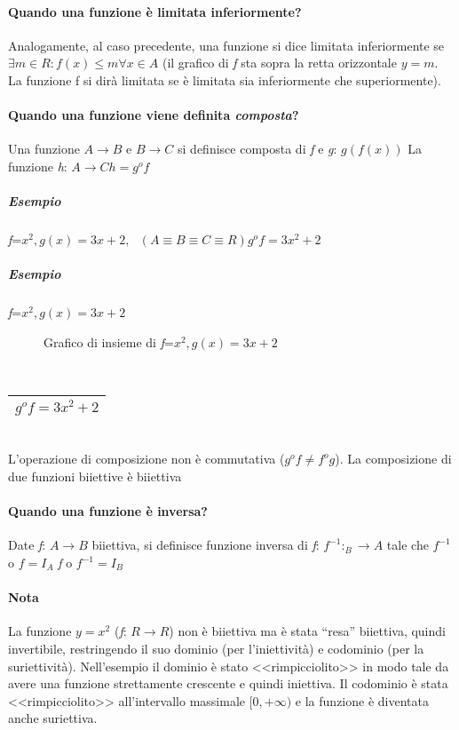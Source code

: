 \paragraph{Quando una funzione è limitata inferiormente?}
Analogamente, al caso precedente, una funzione si dice limitata inferiormente
se $\exists m\in R:f(x)\leq m \forall x \in A$ (il grafico di \textit{f} sta
sopra la retta orizzontale $y=m$. La funzione f si dirà limitata se è limitata
sia inferiormente che superiormente).
\paragraph{Quando una funzione viene definita \textit{composta}?}
Una funzione $A\to B \text{ e } B\to C$ si definisce composta di \textit{f} e
\textit{g}: $g(f(x))$ La funzione \textit{h}: $A\to C h=g^of$
\subparagraph{Esempio} \textit{f}=$x^2,g(x)=3x+2, \text{ } (A \equiv B \equiv C
\equiv R) g^of=3x^2+2$
\subparagraph {Esempio}
\textit{f}=$x^2,g(x)=3x+2$
\begin{figure}[!ht]
	\centering
	\caption{Grafico di insieme di \textit{f}=$x^2,g(x)=3x+2$}
\end{figure}\\
\begin{tabular}{|l|}
	\hline
		$g^of=3x^2+2$\\
	\hline
\end{tabular}\\
L'operazione di composizione non è commutativa ($g^of\neq f^og$). La
composizione di due funzioni biiettive è biiettiva
\paragraph{Quando una funzione è inversa?}
Date \textit{f}: $A\to B$ biiettiva, si definisce funzione inversa di
\textit{f}: $f^{-1}:_B\to A$ tale che $f^{-1}$ o $f=I_A$ \textit{f} o
$f^{-1}=I_B$
\paragraph{Nota} La funzione $y=x^2$ (\textit{f}: $R\to R$) non è biiettiva ma
è stata ``resa'' biiettiva, quindi invertibile, restringendo il suo dominio
(per l'iniettività) e codominio (per la suriettività). Nell'esempio il dominio
è stato <<rimpicciolito>> in modo tale da avere una funzione strettamente
crescente e quindi iniettiva. Il codominio è stata <<rimpicciolito>>
all'intervallo massimale $[0,+\infty)$ e la funzione è diventata anche
suriettiva.
